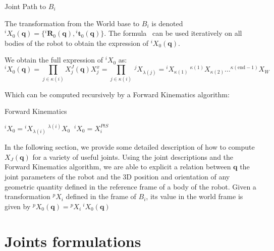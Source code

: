 \begin{algorithm}
  \caption{Joint Path to $B_i$}
\label{alg:JP}
\begin{algorithmic}
  \EndWhile{}
\end{algorithmic}
\end{algorithm}

The transformation from the World base to $B_i$ is denoted \\ ${}^i X_0 (\mathbf{q}) = \{{}^i \mathbf{R}_0 (\mathbf{q}), {}^i \mathbf{t}_0 (\mathbf{q})\}$.
The formula~ can be used iteratively on all bodies of the robot to obtain the expression of ${}^i X_0 (\mathbf{q})$.

We obtain the full expression of ${}^i X_0$ as:
\begin{equation}
  {}^i X_0 (\mathbf{q}) = \prod_{j\in\kappa (i)}X^J_j (\mathbf{q}) X^x_j = \prod_{j\in\kappa (i)}\ {}^j X_{\lambda (j)}
  = {}^i X_{\kappa (1)}\ ^{\kappa (1)}X_{\kappa (2)} \dots ^{\kappa (\text{end}-1)}X_{W}
\end{equation}

Which can be computed recursively by a Forward Kinematics algorithm:

\begin{algorithm}
  \caption{Forward Kinematics}
\label{alg:FK}
\begin{algorithmic}
   ${}^i X_0 = {}^i X_{\lambda (i)}\ ^{\lambda (i)}X_0$
  \Else$\ {}^i X_0 = X^{PtS}_i$
  \EndIf{}
  \EndFor{}
\end{algorithmic}
\end{algorithm}

In the following section, we provide some detailed description of how to compute $X_J (\mathbf{q})$ for a variety of useful joints.
Using the joint descriptions and the Forward Kinematics algorithm, we are able to explicit a relation between $\mathbf{q}$ the joint parameters of the robot and the 3D position and orientation of any geometric quantity defined in the reference frame of a body of the robot.
Given a transformation ${}^p X_i$ defined in the frame of $B_i$, its value in the world frame is given by ${}^p X_0 (\mathbf{q}) = {}^p X_i\ {}^i X_0 (\mathbf{q})$



\section{Joints formulations}
\label{sec:joints_formulations}

